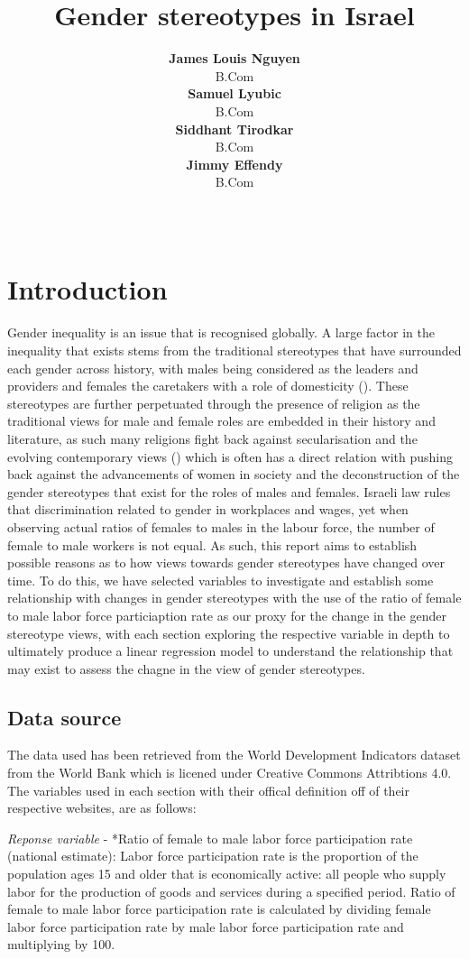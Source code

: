 \documentclass[11pt,a4paper,]{article}
\title{Gender stereotypes in Israel}
\author{\sf\Large\textbf{ James Louis Nguyen}\\ {\sf\large B.Com\\[0.5cm]} \sf\Large\textbf{ Samuel Lyubic}\\ {\sf\large B.Com\\[0.5cm]} \sf\Large\textbf{ Siddhant Tirodkar}\\ {\sf\large B.Com\\[0.5cm]} \sf\Large\textbf{ Jimmy Effendy}\\ {\sf\large B.Com\\[0.5cm]}}
\date{\sf\Date~\Month~\Year}
\makeatletter
\def\titlepage{\front{\expandafter{\@title}}{\@author}{\@organization}}
\makeatother
\begin{document}
\titlepage

\section*{Introduction}

Gender inequality is an issue that is recognised globally. A large
factor in the inequality that exists stems from the traditional
stereotypes that have surrounded each gender across history, with males
being considered as the leaders and providers and females the caretakers
with a role of domesticity (\textcite{Woodhead}). These stereotypes are
further perpetuated through the presence of religion as the traditional
views for male and female roles are embedded in their history and
literature, as such many religions fight back against secularisation and
the evolving contemporary views (\textcite{VoicuM2009}) which is often
has a direct relation with pushing back against the advancements of
women in society and the deconstruction of the gender stereotypes that
exist for the roles of males and females. Israeli law rules that
discrimination related to gender in workplaces and wages, yet when
observing actual ratios of females to males in the labour force, the
number of female to male workers is not equal. As such, this report aims
to establish possible reasons as to how views towards gender stereotypes
have changed over time. To do this, we have selected variables to
investigate and establish some relationship with changes in gender
stereotypes with the use of the ratio of female to male labor force
particiaption rate as our proxy for the change in the gender stereotype
views, with each section exploring the respective variable in depth to
ultimately produce a linear regression model to understand the
relationship that may exist to assess the chagne in the view of gender
stereotypes.

\subsection{Data source}\label{data-source}

The data used has been retrieved from the World Development Indicators
dataset from the World Bank \textcite{TheWorldBank2020} which is licened
under Creative Commons Attribtions 4.0. The variables used in each
section with their offical definition off of their respective websites,
are as follows:

\emph{Reponse variable} - *Ratio of female to male labor force
participation rate (national estimate): Labor force participation rate
is the proportion of the population ages 15 and older that is
economically active: all people who supply labor for the production of
goods and services during a specified period. Ratio of female to male
labor force participation rate is calculated by dividing female labor
force participation rate by male labor force participation rate and
multiplying by 100.
\end{document}
